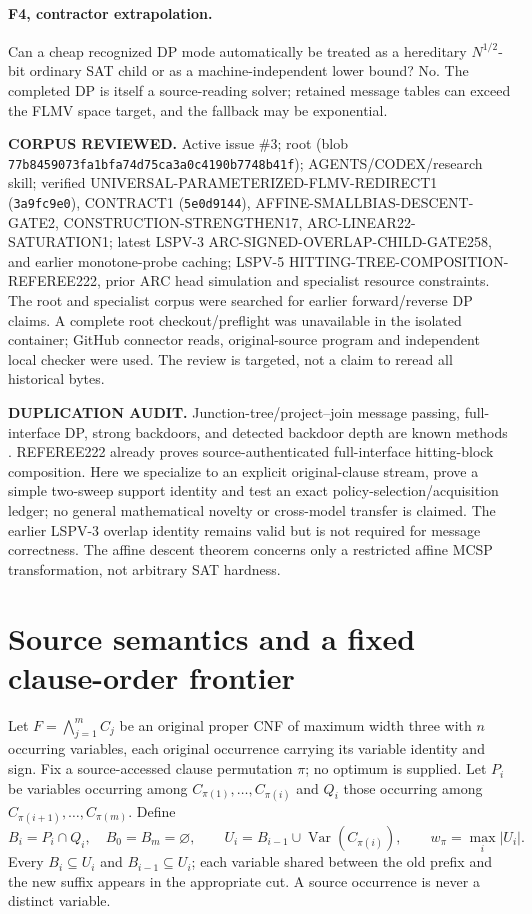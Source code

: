 \documentclass[10pt]{article}
\begin{document}
\paragraph{F4, contractor extrapolation.} Can a cheap recognized DP mode automatically be treated as a hereditary $N^{1/2}$-bit ordinary SAT child or as a machine-independent lower bound? No. The completed DP is itself a source-reading solver; retained message tables can exceed the FLMV space target, and the fallback may be exponential.

\textbf{CORPUS REVIEWED.} Active issue \#3; root  (blob \texttt{77b8459073fa1bfa74d75ca3a0c4190b7748b41f}); AGENTS/CODEX/research skill; verified UNIVERSAL-PARAMETERIZED-FLMV-REDIRECT1 (\texttt{3a9fc9e0}), CONTRACT1 (\texttt{5e0d9144}), AFFINE-SMALLBIAS-DESCENT-GATE2, CONSTRUCTION-STRENGTHEN17, ARC-LINEAR22-SATURATION1; latest LSPV-3 ARC-SIGNED-OVERLAP-CHILD-GATE258, and earlier monotone-probe caching; LSPV-5 HITTING-TREE-COMPOSITION-REFEREE222, prior ARC head simulation and specialist resource constraints. The root and specialist corpus were searched for earlier forward/reverse DP claims. A complete root checkout/preflight was unavailable in the isolated container; GitHub connector reads, original-source program and independent local checker were used. The review is targeted, not a claim to reread all historical bytes.

\textbf{DUPLICATION AUDIT.} Junction-tree/project--join message passing, full-interface DP, strong backdoors, and detected backdoor depth are known methods \cite{dpmc,hetero,depth}. REFEREE222 already proves source-authenticated full-interface hitting-block composition. Here we specialize to an explicit original-clause stream, prove a simple two-sweep support identity and test an exact policy-selection/acquisition ledger; no general mathematical novelty or cross-model transfer is claimed. The earlier LSPV-3 overlap identity remains valid but is not required for message correctness. The affine descent theorem concerns only a restricted affine MCSP transformation, not arbitrary SAT hardness.

\section{Source semantics and a fixed clause-order frontier}
Let $F=\bigwedge_{j=1}^m C_j$ be an original proper CNF of maximum width three with $n$ occurring variables, each original occurrence carrying its variable identity and sign. Fix a source-accessed clause permutation $\pi$; no optimum is supplied. Let $P_i$ be variables occurring among $C_{\pi(1)},\ldots,C_{\pi(i)}$ and $Q_i$ those occurring among $C_{\pi(i+1)},\ldots,C_{\pi(m)}$. Define
\[
 B_i=P_i\cap Q_i,\quad B_0=B_m=\varnothing,\qquad
 U_i=B_{i-1}\cup\operatorname{Var}(C_{\pi(i)}),\qquad
 w_\pi=\max_i|U_i|.
\]
Every $B_i\subseteq U_i$ and $B_{i-1}\subseteq U_i$; each variable shared between the old prefix and the new suffix appears in the appropriate cut. A source occurrence is never a distinct variable.
\end{document}
